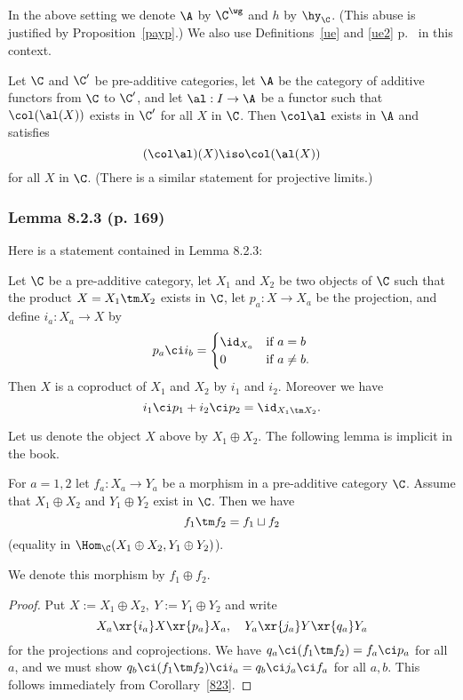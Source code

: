 \documentclass[12pt]{article}
\theoremstyle{remark}
\theoremstyle{definition}
\begin{document}
\begin{conv}
In the above setting we denote $\A$ by $\C^\wg$ and $h$ by $\hy_\C$. (This abuse is justified by Proposition~\ref{payp}.) We also use Definitions~\ref{ue} and \ref{ue2} p.~ in this context. 
\end{conv} 

\begin{lem}
Let $\C$ and $\C'$ be pre-additive categories, let $\A$ be the category of additive functors from $\C$ to $\C'$, and let $\al:I\to\A$ be a functor such that $\col(\al(X))$ exists in $\C'$ for all $X$ in $\C$. Then $\col\al$ exists in $\A$ and satisfies 
$$
(\col\al)(X)\iso\col(\al(X))
$$ 
for all $X$ in $\C$. (There is a similar statement for projective limits.)
\end{lem}


\subsubsection{Lemma 8.2.3 (p. 169)}

Here is a statement contained in Lemma 8.2.3:

\begin{cor}
Let $\C$ be a pre-additive category, let $X_1$ and $X_2$ be two objects of $\C$ such that the product $X=X_1\tm X_2$ exists in $\C$, let $p_a:X\to X_a$ be the projection, and define $i_a:X_a\to X$ by 
$$
p_a\ci i_b=\begin{cases}\id_{X_a}&\text{if }a=b\\0&\text{if }a\not=b.\end{cases}
$$ 
Then $X$ is a coproduct of $X_1$ and $X_2$ by $i_1$ and $i_2$. Moreover we have 
$$
i_1\ci p_1+i_2\ci p_2=\id_{X_1\tm X_2}.
$$
\end{cor}

Let us denote the object $X$ above by $X_1\oplus X_2$. The following lemma is implicit in the book. 

\begin{lem}
For $a=1,2$ let $f_a:X_a\to Y_a$ be a morphism in a pre-additive category $\C$. Assume that $X_1\oplus X_2$ and $Y_1\oplus Y_2$ exist in $\C$. Then we have 
$$
f_1\tm f_2=f_1\sqcup f_2
$$ 
(equality in $\Hom_\C(X_1\oplus X_2,Y_1\oplus Y_2)$). 
\end{lem} 

We denote this morphism by $f_1\oplus f_2$.\medskip 

\begin{proof}
Put $X:=X_1\oplus X_2,\ Y:=Y_1\oplus Y_2$ and write 
$$
X_a\xr{i_a}X\xr{p_a}X_a,\quad Y_a\xr{j_a}Y\xr{q_a}Y_a
$$ 
for the projections and coprojections. We have $q_a\ci(f_1\tm f_2)=f_a\ci p_a$ for all $a$, and we must show $q_b\ci (f_1\tm f_2)\ci i_a=q_b\ci j_a\ci f_a$ for all $a,b$. This follows immediately from Corollary~\ref{823}.
\end{proof}
\end{document}
